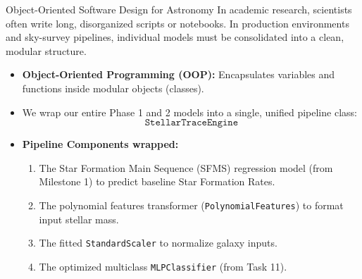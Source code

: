 \documentclass[9pt]{beamer}
\begin{document}
\begin{frame}{Object-Oriented Software Design for Astronomy}
  In academic research, scientists often write long, disorganized scripts or notebooks. In production environments and sky-survey pipelines, individual models must be consolidated into a clean, modular structure.
  \begin{itemize}
    \item \textbf{Object-Oriented Programming (OOP):} Encapsulates variables and functions inside modular objects (classes).
    \item We wrap our entire Phase 1 and 2 models into a single, unified pipeline class:
      $$\texttt{StellarTraceEngine}$$
    \item \textbf{Pipeline Components wrapped:}
      \begin{enumerate}
        \item The Star Formation Main Sequence (SFMS) regression model (from Milestone 1) to predict baseline Star Formation Rates.
        \item The polynomial features transformer (\texttt{PolynomialFeatures}) to format input stellar mass.
        \item The fitted \texttt{StandardScaler} to normalize galaxy inputs.
        \item The optimized multiclass \texttt{MLPClassifier} (from Task 11).
      \end{enumerate}
  \end{itemize}
\end{frame}
\end{document}
